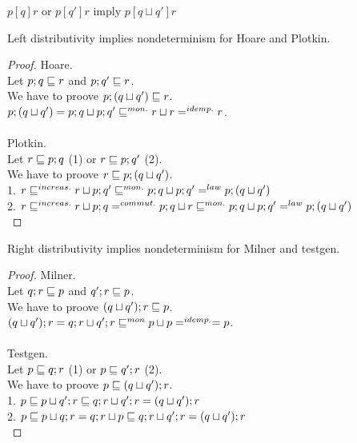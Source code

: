 \documentclass{article}
\begin{document}
\begin{rul}
$p [q] r$ or $p [q'] r$ imply $p [q \sqcup q'] r$
\end{rul}

\begin{theorem}
Left distributivity implies nondeterminism for Hoare and Plotkin.
\end{theorem}

\verified

\begin{proof}
Hoare.\\
Let $p; q \sqsubseteq r$ and $p; q' \sqsubseteq r$.\\
We have to proove $p; (q \sqcup q') \sqsubseteq r$.\\
$p; (q \sqcup q') = p; q \sqcup p; q' \sqsubseteq^{mon.} r \sqcup r =^{idemp.} r$.\\
\\
Plotkin.\\
Let $r \sqsubseteq p; q$ (1) or $r \sqsubseteq p; q'$ (2).\\
We have to proove $r \sqsubseteq p; (q \sqcup q')$.\\
1. $r \sqsubseteq^{increas.} r \sqcup p; q' \sqsubseteq^{mon.} p; q \sqcup p; q' =^{law} p; (q \sqcup q')$\\
2. $r \sqsubseteq^{increas.} r \sqcup p; q =^{commut.} p; q \sqcup r \sqsubseteq^{mon.} p; q \sqcup p; q' =^{law} p; (q \sqcup q')$\\
\end{proof}

\begin{theorem}
Right distributivity implies nondeterminism for Milner and testgen.
\end{theorem}

\verified

\begin{proof}
Milner.\\
Let $q; r \sqsubseteq p$ and $q'; r \sqsubseteq p$.\\
We have to proove $(q \sqcup q'); r \sqsubseteq p$.\\
$(q \sqcup q'); r = q; r \sqcup q'; r \sqsubseteq^{mon} p \sqcup p =^{idemp.} = p$.\\
\\
Testgen.\\
Let $p \sqsubseteq q; r$ (1) or $p \sqsubseteq q'; r$ (2).\\
We have to proove $p \sqsubseteq (q \sqcup q'); r$.\\
1. $p \sqsubseteq p \sqcup q'; r \sqsubseteq q; r \sqcup q'; r = (q \sqcup q'); r$\\
2. $p \sqsubseteq p \sqcup q; r = q; r \sqcup p \sqsubseteq q; r \sqcup q'; r = (q \sqcup q'); r$\\
\end{proof}
\end{document}
